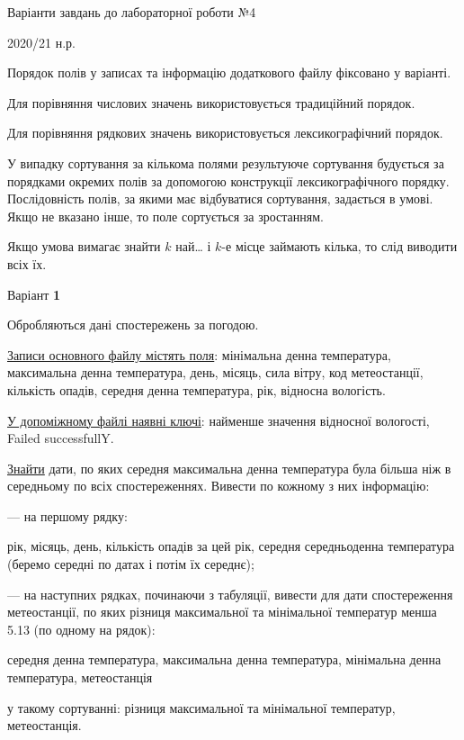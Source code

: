 \documentclass[11pt, ukrainian]{article}
\begin{document}
{\Large \center  Варіанти завдань до лабораторної роботи №4\par 2020/21 н.р.\par \bigskip\bigskip}

Порядок полів у записах та інформацію додаткового файлу фіксовано у варіанті.

Для порівняння числових значень використовується традиційний порядок.

Для порівняння рядкових значень використовується лексикографічний порядок. 

У випадку сортування за кількома полями результуюче сортування будується 
за порядками окремих полів за допомогою конструкції лексикографічного порядку. 
Послідовність полів, за якими має відбуватися сортування, задається в умові. 
Якщо не вказано інше, то поле сортується за зростанням.

Якщо умова вимагає знайти $k$ най… і $k$-е місце займають кілька, то слід виводити всіх їх.

\newpage
\par \bigskip

{\center Варіант  \No \textbf { 1 }\par}
\bigskip
Обробляються дані спостережень за погодою. 

\underline{Записи основного файлу містять поля}: мінімальна денна температура, максимальна денна температура, день, місяць, сила вітру, код метеостанції, кількість опадів, середня денна температура, рік, відносна вологість.

\underline{У допоміжному файлі наявні ключі}: найменше значення відносної вологості, Failed successfullY.

\underline{Знайти} дати, по яких середня максимальна денна температура була більша ніж в середньому по всіх спостереженнях. Вивести по кожному з них інформацію:\par
{\noindent}--- на першому рядку:\par
рік, місяць, день, кількість опадів за цей рік, середня середньоденна температура (беремо середні по датах і потім їх середнє);

{\noindent}--- на наступних рядках, починаючи з табуляції, вивести для дати спостереження метеостанції, по яких різниця максимальної та мінімальної температур менша 5.13 (по одному на рядок):\par
середня денна температура, максимальна денна температура, мінімальна денна температура, метеостанція

{\noindent}у такому сортуванні: різниця максимальної та мінімальної температур, метеостанція.
\end{document}
